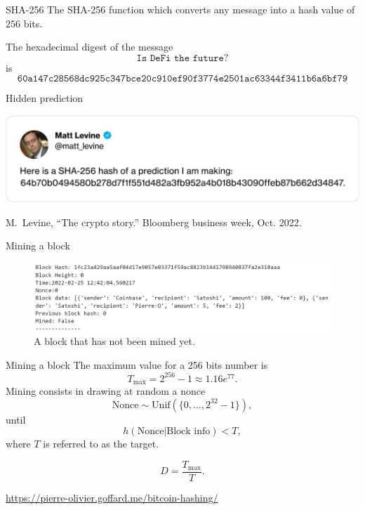 \documentclass{beamer}
\begin{document}
\begin{frame}{SHA-256}
The SHA-256 function which converts any message into a hash value of $256$ bits.
\begin{tcolorbox}[enhanced,drop shadow, title=Example]
The hexadecimal digest of the message
$$
\texttt{Is DeFi the future?}
$$
is 
\footnotesize
$$
\texttt{60a147c28568dc925c347bce20c910ef90f3774e2501ac63344f3411b6a6bf79}
$$
\end{tcolorbox}
\end{frame}
\begin{frame}{Hidden prediction}
\begin{center}
 \includegraphics[width= \textwidth]{../../Figures/levine_twitter}
\end{center}
\footnotesize{
\begin{thebibliography}{1}
M.~Levine, ``The crypto story.'' Bloomberg business week, Oct. 2022.\\
\end{thebibliography}  
}




\end{frame}
\begin{frame}{Mining a block}
\begin{figure}[!ht]
    \includegraphics[width = \textwidth]{../../Figures/block_not_mined.png}
    \captionsetup{width=0.8\textwidth}
    \centering
    \caption{A block that has not been mined yet.}
    \label{fig:block_not_mined}
\end{figure}
\end{frame}
\begin{frame}{Mining a block}
The maximum value for a 256 bits number is
$$
T_\text{max} = 2^{256}-1 \approx 1.16e^{77}.
$$
Mining consists in drawing at random a nonce 
$$
\text{Nonce} \sim \text{Unif}(\{0,\ldots, 2^{32}-1\}),
$$
until 
$$
h(\text{Nonce}|\text{Block info})<T,
$$
where $T$ is referred to as the target.
\begin{tcolorbox}[enhanced,drop shadow, title=Difficulty of the cryptopuzzle]
$$
D = \frac{T_{\max}}{T}.
$$
\end{tcolorbox}
\url{https://pierre-olivier.goffard.me/bitcoin-hashing/}
\end{frame}
\end{document}
